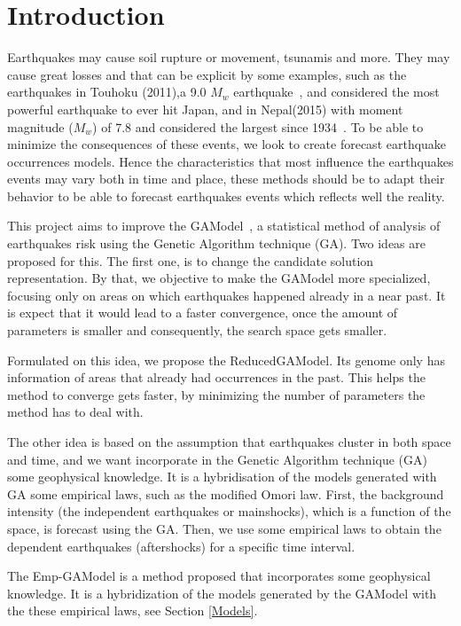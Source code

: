 
\section{Introduction}\label{intro}

Earthquakes may cause soil rupture or movement, tsunamis and
more. They may cause great losses and that can be explicit by some
examples, such as the earthquakes in Touhoku (2011),a 9.0 $M_w$ earthquake~\cite{simons20112011}, and considered the most powerful earthquake to ever hit Japan, and in Nepal(2015) with moment magnitude ($M_w$) of 7.8 and considered the largest since 1934~\cite{wilkinson20152015}. To
be able to minimize the consequences of these events, we look to
create forecast earthquake occurrences models. Hence the
characteristics that most influence the earthquakes events may vary
both in time and place, these methods should be to adapt their
behavior to be able to forecast earthquakes events which reflects well
the reality.

This project aims to improve the GAModel~\cite{ecta14}, a statistical method of analysis of
earthquakes risk using the Genetic Algorithm technique (GA). Two
ideas are proposed for this. The first one, is to change the
candidate solution representation. By that, we objective to make the
GAModel more specialized, focusing only on areas on which earthquakes
happened already in a near past. It is expect that it would lead to a faster
convergence, once the amount of parameters is smaller and
consequently, the search space gets smaller.

Formulated on this idea, we propose the ReducedGAModel. Its genome
only has information of areas that already had occurrences in the
past. This helps the method to converge gets faster, by minimizing the
number of parameters the method has to deal with.

The other idea is based on the assumption that earthquakes cluster in
both space and time, and we want incorporate in the Genetic Algorithm
technique (GA) some geophysical knowledge. It is a hybridisation of the models generated with GA some empirical laws, such as the modified Omori
law. First, the background intensity (the independent earthquakes or
mainshocks), which is a function of the space, is forecast using the
GA. Then, we use some empirical laws to obtain the dependent
earthquakes (aftershocks) for a specific time interval.

The Emp-GAModel is a method proposed that incorporates some
geophysical knowledge. It is a hybridization of the models generated
by the GAModel with the these empirical laws, see Section
\ref{Models}.

